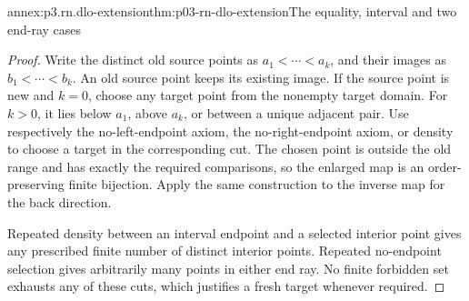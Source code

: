 \begin{annexitem}{annex:p3.rn.dlo-extension}{thm:p03-rn-dlo-extension}{The equality, interval and two end-ray cases}
\begin{proof}
Write the distinct old source points as
\(a_1<\cdots<a_k\), and their images as
\(b_1<\cdots<b_k\).
An old source point keeps its existing image.
If the source point is new and \(k=0\), choose any
target point from the nonempty target domain.
For \(k>0\), it lies below \(a_1\), above \(a_k\),
or between a unique adjacent pair.
Use respectively the no-left-endpoint axiom,
the no-right-endpoint axiom, or density to choose
a target in the corresponding cut.
The chosen point is outside the old range and has
exactly the required comparisons, so the enlarged
map is an order-preserving finite bijection.
Apply the same construction to the inverse map for
the back direction.

Repeated density between an interval endpoint and
a selected interior point gives any prescribed
finite number of distinct interior points.
Repeated no-endpoint selection gives arbitrarily
many points in either end ray.
No finite forbidden set exhausts any of these cuts,
which justifies a fresh target whenever required.
\end{proof}
\end{annexitem}

